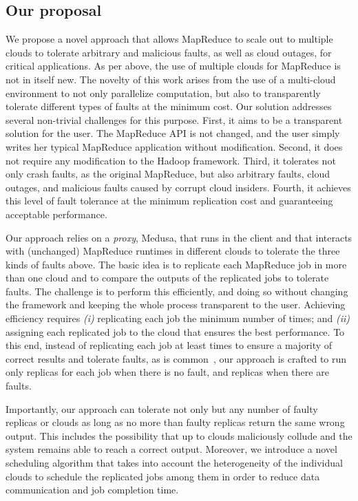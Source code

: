 \documentclass[10pt, conference, compsocconf]{IEEEtran}
\begin{document}
\subsection{Our proposal}

We propose a novel approach that allows MapReduce to scale out to multiple clouds to tolerate arbitrary and malicious faults, as well as cloud outages, for critical applications.
As per above, the use of multiple clouds for MapReduce is not in itself new.
The novelty of this work arises from the use of a multi-cloud environment to not only parallelize computation, but also to transparently tolerate different types of faults at the minimum cost.
Our solution addresses several non-trivial challenges for this purpose.
First, it aims to be a transparent solution for the user.
The MapReduce API is not changed, and the user simply writes her typical MapReduce application without modification.
Second, it does not require any modification to the Hadoop framework.
Third, it tolerates not only crash faults, as the original MapReduce, but also arbitrary faults, cloud outages, and malicious faults caused by corrupt cloud insiders.
Fourth, it achieves this level of fault tolerance at the minimum replication cost and guaranteeing acceptable performance.

Our approach relies on a \emph{proxy}, Medusa, that runs in the client and that interacts with (unchanged) MapReduce runtimes in different clouds to tolerate the three kinds of faults above.
The basic idea is to replicate each MapReduce job in more than one cloud and to compare the outputs of the replicated jobs to tolerate faults.
The challenge is to perform this efficiently, and doing so without changing the framework and keeping the whole process transparent to the user.
Achieving efficiency requires \textit{(i)} replicating each job the minimum number of times; and \textit{(ii)} assigning each replicated job to the cloud that ensures the best performance.
To this end, instead of replicating each job at least  times to ensure a majority of correct results and tolerate  faults, as is common~\cite{Sch90, Veronese:13}, our approach is crafted to run only  replicas for each job when there is no fault, and  replicas when there are  faults.

Importantly, our approach can tolerate not only  but any number of faulty replicas or clouds as long as no more than  faulty replicas return the same wrong output.
This includes the possibility that up to  clouds maliciously collude and the system remains able to reach a correct output.
Moreover, we introduce a novel scheduling algorithm that takes into account the heterogeneity of the individual clouds to schedule the replicated jobs among them in order to reduce data communication and job completion time.
\end{document}
